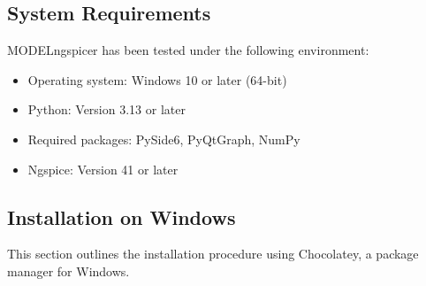 \documentclass[a4paper,12pt,titlepage]{article}
\begin{document}
\subsection{System Requirements}

MODELngspicer has been tested under the following environment:

\begin{itemize}
    \setlength{\parskip}{0mm}
    \setlength{\itemsep}{0mm}
    \item Operating system: Windows 10 or later (64-bit)
    \item Python: Version 3.13 or later
    \item Required packages: PySide6, PyQtGraph, NumPy
    \item Ngspice: Version 41 or later
\end{itemize}

\subsection{Installation on Windows}

This section outlines the installation procedure using Chocolatey, a package manager for Windows.
\end{document}
